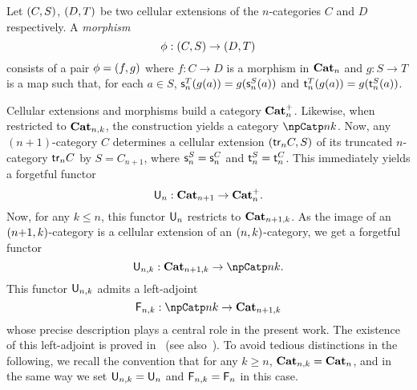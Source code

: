 Let $(C,S)$, $(D,T)$ be two cellular extensions of the
$n$-categories $C$ and $D$ respectively.  A {\em morphism}
 \[\phi:(C,S)\to(D,T)\]
 consists of a pair $\phi=(f,g)$ where $f:C\to D$ is a morphism in
 $\mathbf{Cat}_{n}$ and $g:S\to T$ is a map such that, for each $a\in S$, $\mathsf{s}_{n}^T(g(a))=g(\mathsf{s}_{n}^S(a))$ and $\mathsf{t}_{n}^T(g(a))=g(\mathsf{t}_{n}^S(a))$.

 Cellular extensions and morphisms build a category $\mathbf{Cat}_{n}^{+}$. Likewise, when restricted to $\mathbf{Cat}_{n,k}$, the
 construction yields a category $\npCatp nk$. Now,
 any $(n{+}1)$-category $C$ determines a cellular extension $(\mathsf{tr}_{n} C,S)$ of its truncated $n$-category $\mathsf{tr}_{n} C$ by
 $S=C_{n+1}$, where $\mathsf{s}_{n}^S=\mathsf{s}_{n}^C$ and $\mathsf{t}_{n}^S=\mathsf{t}_{n}^C$.
 This immediately yields a forgetful functor
 \[\mathsf{U}_{n}:\mathbf{Cat}_{n+1}\to \mathbf{Cat}_{n}^{+}.\]
Now, for any $k\leq n$, this functor $\mathsf{U}_{n}$ restricts to
$\mathbf{Cat}_{n+1,k}$. As the image of an $(n{+}1,k)$-category is a
cellular extension of an
$(n,k)$-category, we get a forgetful functor
\[\fgf{n,k}:\npCat{n+1}{k}\to \npCatp nk.\]
This functor $\mathsf{U}_{n,k}$ admits a left-adjoint
\[\frf{n,k}:\npCatp nk\to \npCat{n+1}{k}\]
whose precise description plays a central role in the present
work. The existence of this left-adjoint is proved
in~\cite{batanin:comfmg} (see also~\cite[Ch.18]{abgmmm:polybk}). To
avoid tedious distinctions in the following, we recall the convention that
for any $k\geq n$, $\mathbf{Cat}_{n,k}=\mathbf{Cat}_{n}$, and in the same way we set
$\mathsf{U}_{n,k}=\mathsf{U}_{n}$ and $\mathsf{F}_{n,k}=\mathsf{F}_{n}$ in this case.

